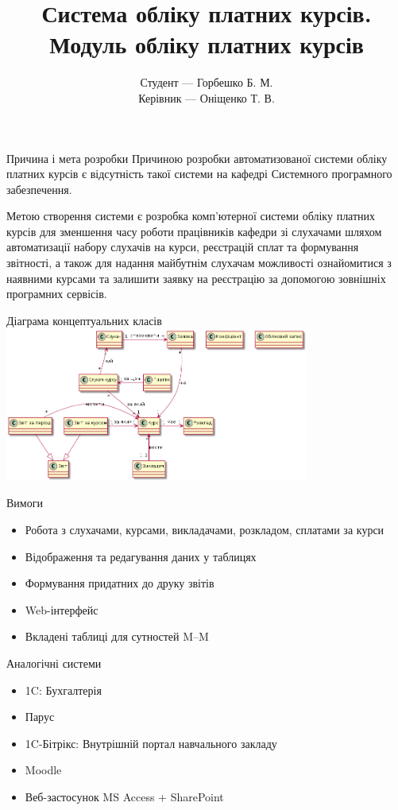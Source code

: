 \documentclass{beamer}
\begin{document}
\newcommand{\fn}{}
\fn
{}
\title{Система обліку платних курсів. Модуль обліку платних курсів}
\author{Студент --- Горбешко Б. М.\\Керівник --- Оніщенко Т. В.}
\date{}
\frame{\titlepage}
\begin{frame}{\fn Причина і мета розробки}
Причиною розробки автоматизованої системи обліку платних курсів є відсутність такої системи на кафедрі Системного програмного забезпечення.

Метою створення системи є розробка комп'ютерної системи обліку платних курсів для зменшення часу роботи працівників кафедри зі слухачами шляхом автоматизації набору слухачів на курси, реєстрацій сплат та формування звітності, а також для надання майбутнім слухачам можливості ознайомитися з наявними курсами та залишити заявку на реєстрацію за допомогою зовнішніх програмних сервісів.
\end{frame}
\begin{frame}{\fn Діаграма концептуальних класів}
\includegraphics[width=10cm]{pp_pw3_conc.png}
\end{frame}
\begin{frame}{\fn Вимоги}
\begin{itemize}
\item Робота з слухачами, курсами, викладачами, розкладом, сплатами за курси
\item Відображення та редагування даних у таблицях
\item Формування придатних до друку звітів
\item Web-інтерфейс
\item Вкладені таблиці для сутностей M--M
\end{itemize}
\end{frame}
\begin{frame}{\fn Аналогічні системи}
\begin{itemize}
\item 1C: Бухгалтерія
\item Парус
\item 1C-Бітрікс: Внутрішній портал навчального закладу
\item Moodle
\item Веб-застосунок MS Access + SharePoint
\end{itemize}
\end{frame}
\end{document}

